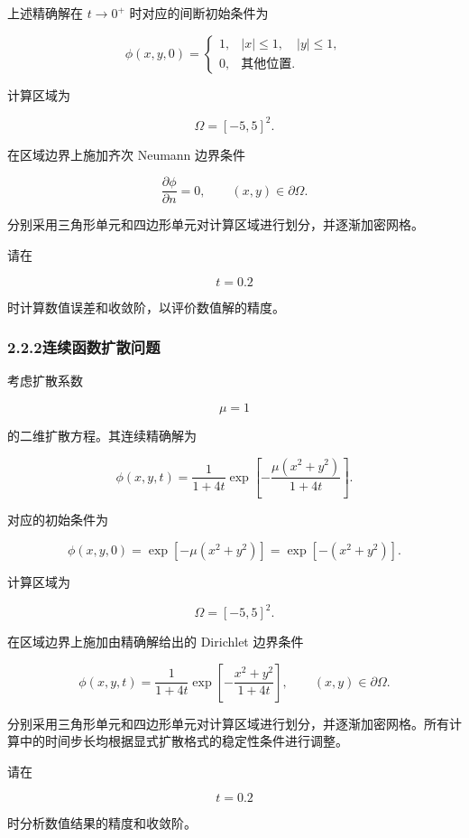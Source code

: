 \documentclass[UTF8,12pt,a4paper,fontset=fandol]{ctexart}
\begin{document}
上述精确解在 $t\to0^+$ 时对应的间断初始条件为

\begin{equation}
\phi(x,y,0)=
\begin{cases}
1, & |x|\leq1,\quad |y|\leq1,\\[1mm]
0, & \text{其他位置}.
\end{cases}
\end{equation}

计算区域为

\begin{equation}
\Omega=[-5,5]^2.
\end{equation}

在区域边界上施加齐次 Neumann 边界条件

\begin{equation}
\frac{\partial\phi}{\partial n}=0,
\qquad (x,y)\in\partial\Omega.
\end{equation}

分别采用三角形单元和四边形单元对计算区域进行划分，并逐渐加密网格。

请在

\begin{equation}
t=0.2
\end{equation}

时计算数值误差和收敛阶，以评价数值解的精度。

\subsubsection{2.2.2\quad 连续函数扩散问题}

考虑扩散系数

\begin{equation}
\mu=1
\end{equation}

的二维扩散方程。其连续精确解为

\begin{equation}
\phi(x,y,t)
=\frac{1}{1+4t}
\exp\left[
-\frac{\mu(x^2+y^2)}{1+4t}
\right].
\end{equation}

对应的初始条件为

\begin{equation}
\phi(x,y,0)
=\exp\left[-\mu(x^2+y^2)\right]
=\exp\left[-(x^2+y^2)\right].
\end{equation}

计算区域为

\begin{equation}
\Omega=[-5,5]^2.
\end{equation}

在区域边界上施加由精确解给出的 Dirichlet 边界条件

\begin{equation}
\phi(x,y,t)
=\frac{1}{1+4t}
\exp\left[
-\frac{x^2+y^2}{1+4t}
\right],
\qquad (x,y)\in\partial\Omega.
\end{equation}

分别采用三角形单元和四边形单元对计算区域进行划分，并逐渐加密网格。所有计算中的时间步长均根据显式扩散格式的稳定性条件进行调整。

请在

\begin{equation}
t=0.2
\end{equation}

时分析数值结果的精度和收敛阶。
\end{document}
